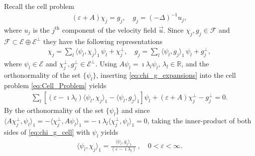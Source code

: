\documentclass{article}
\newcommand{\Fc}{\mathcal{F}}
\newcommand{\Ec}{\mathcal{E}}
\newcommand{\0}{\mathbf{0}}
\newcommand{\1}{\mathbf{1}}
\newcommand{\2}{\mathbf{2}}
\newcommand{\3}{\mathbf{3}}
\newcommand{\4}{\mathbf{4}}
\newcommand{\5}{\mathbf{5}}
\newcommand{\6}{\mathbf{6}}
\newcommand{\7}{\mathbf{7}}
\newcommand{\8}{\mathbf{8}}
\begin{document}
Recall the cell problem
% 
\begin{align}\label{eq:Cell_Problem}
  (\varepsilon+A)\chi_j=g_j, \quad g_j=(-\Delta)^{-1}u_j,
\end{align}
%
where $u_j$ is the $j^{\text{th}}$ component of the velocity field
$\vec{u}$. Since $\chi_j,g_j\in\Fc$ and $\Fc\subset\Ec\oplus\Ec^\perp$ they have the
following representations 
%
\begin{align}\label{eq:chi_g_expansions}
  \chi_j=\sum_l\langle\psi_l,\chi_j\rangle_1\,\psi_l +\chi_j^\perp, \quad  g_j=\sum_l\langle\psi_l,g_j\rangle_1\,\psi_l +g_j^\perp,
\end{align}
%
where $\psi_l\in\Ec$ and $\chi_j^\perp,g_j^\perp\in\Ec^\perp$. Using $A\psi_l=\imath\lambda_l\psi_l$,
$\lambda_l\in\mathbb{R}$, and the orthonormality of the set $\{\psi_l\}$, inserting 
\eqref{eq:chi_g_expansions} into the cell problem
\eqref{eq:Cell_Problem} yields
%
\begin{align}\label{eq:chi_g_cell}
  \sum_l[(\varepsilon-\imath\lambda_l)\langle\psi_l,\chi_j\rangle_1-\langle\psi_l,g_j\rangle_1]\psi_l+(\varepsilon+A)\chi_j^\perp-g_j^\perp=0.
\end{align}
%
By the orthonormality of the set $\{\psi_l\}$ and since
$\langle A\chi_j^\perp,\psi_l\rangle_1=-\langle\chi_j^\perp,A\psi_l\rangle_1=-\imath\lambda_l\langle\chi_j^\perp,\psi_l\rangle_1=0$, taking the
inner-product of both sides of \eqref{eq:chi_g_cell} with $\psi_l$ yields 
%
\begin{align}\label{eq:Coefficients}
  \langle\psi_l,\chi_j\rangle_1=\frac{\langle\psi_l,g_j\rangle_1}{(\varepsilon-\imath\lambda_l)}\,, \quad
  0<\varepsilon<\infty.
\end{align}
%
\end{document}
